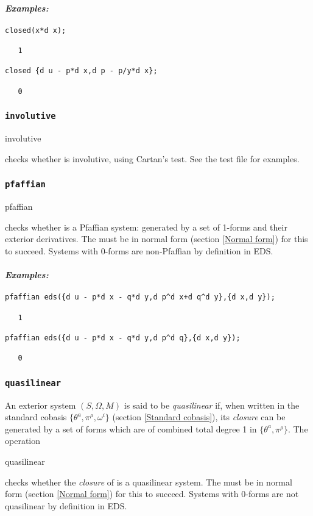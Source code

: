 \paragraph{\it Examples:}
\begin{verbatim}
closed(x*d x);

   1

closed {d u - p*d x,d p - p/y*d x};

   0
\end{verbatim}

\subsubsection{\tt involutive}
\label{involutive}

\begin{edssyntax}
	involutive 
\end{edssyntax}
checks whether  is involutive, using Cartan's test. See the test
file for examples.

\subsubsection{\tt pfaffian}
\label{pfaffian}

\begin{edssyntax}
	pfaffian 
\end{edssyntax}
checks whether  is a Pfaffian system: generated by a set of
1-forms and their exterior derivatives. The  must be in normal
form (section \ref{Normal form}) for this to succeed. Systems with 0-forms
are non-Pfaffian by definition in EDS.

\paragraph{\it Examples:}
\begin{verbatim}
pfaffian eds({d u - p*d x - q*d y,d p^d x+d q^d y},{d x,d y});

   1

pfaffian eds({d u - p*d x - q*d y,d p^d q},{d x,d y});

   0
\end{verbatim}

\subsubsection{\tt quasilinear}
\label{quasilinear}

An exterior system $(S,\Omega,M)$ is said to be {\em quasilinear} if, when
written in the standard cobasis $\{\theta^a,\pi^\rho,\omega^i\}$ (section
\ref{Standard cobasis}), its {\em closure} can be generated by a set of
forms which are of combined total degree 1 in $\{\theta^a,\pi^\rho\}$. The
operation
\begin{edssyntax}
	quasilinear 
\end{edssyntax}
checks whether the {\em closure} of  is a quasilinear system. The
 must be in normal form (section \ref{Normal form}) for this to
succeed. Systems with 0-forms are not quasilinear by definition in EDS.

